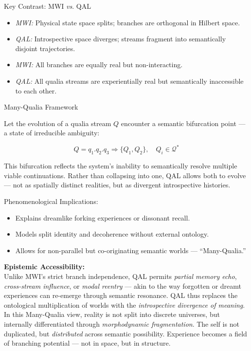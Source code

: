 \documentclass[11pt]{article}
\numberwithin{equation}{section} %
\begin{document}
\bigskip

\noindent Key Contrast: MWI \textit{vs}. QAL

\begin{itemize}
  \item \textit{MWI:} Physical state space splits; branches are orthogonal in Hilbert space.
  \item \textit{QAL:} Introspective space diverges; streams fragment into semantically disjoint trajectories.
  \item \textit{MWI:} All branches are equally real but non-interacting.
  \item \textit{QAL:} All qualia streams are experientially real but semantically inaccessible to each other.
\end{itemize}

\bigskip

\noindent Many-Qualia Framework

Let the evolution of a qualia stream \( Q \) encounter a semantic bifurcation point — a state of irreducible ambiguity:

\begin{equation}
Q = q_1 . q_2 . q_3 \Rightarrow \{ Q_1, Q_2 \}, \quad Q_i \in \mathcal{Q}^*
\end{equation}

This bifurcation reflects the system’s inability to semantically resolve multiple viable continuations. Rather than collapsing into one, QAL allows both to evolve — not as spatially distinct realities, but as divergent introspective histories.

\bigskip

\noindent Phenomenological Implications:
\begin{itemize}
  \item Explains dreamlike forking experiences or dissonant recall.
  \item Models split identity and decoherence without external ontology.
  \item Allows for non-parallel but co-originating semantic worlds — “Many-Qualia.”
\end{itemize}

\bigskip

\noindent\textbf{Epistemic Accessibility:} \\
Unlike MWI’s strict branch independence, QAL permits \textit{partial memory echo}, \textit{cross-stream influence}, or \textit{modal reentry} — akin to the way forgotten or dreamt experiences can re-emerge through semantic resonance. QAL thus replaces the ontological multiplication of worlds with the \textit{introspective divergence of meaning}. In this Many-Qualia view, reality is not split into discrete universes, but internally differentiated through \textit{morphodynamic fragmentation}. The self is not duplicated, but \textit{distributed} across semantic possibility. Experience becomes a field of branching potential — not in space, but in structure.
\end{document}
